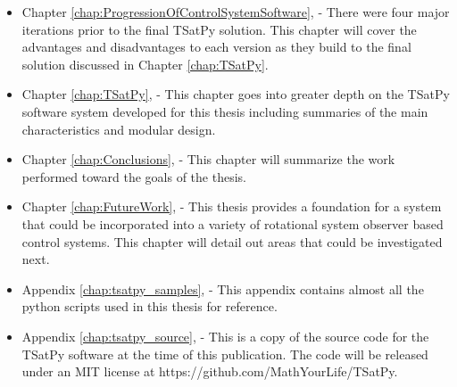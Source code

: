 \begin{itemize}
\item Chapter \ref{chap:ProgressionOfControlSystemSoftware},  - There were four major iterations prior to the final TSatPy solution.  This chapter will cover the advantages and disadvantages to each version as they build to the final solution discussed in Chapter \ref{chap:TSatPy}.
\item Chapter \ref{chap:TSatPy},  - This chapter goes into greater depth on the TSatPy software system developed for this thesis including summaries of the main characteristics and modular design.
\item Chapter \ref{chap:Conclusions},  - This chapter will summarize the work performed toward the goals of the thesis.
\item Chapter \ref{chap:FutureWork},  - This thesis provides a foundation for a system that could be incorporated into a variety of rotational system observer based control systems.  This chapter will detail out areas that could be investigated next.
\item Appendix \ref{chap:tsatpy_samples},  - This appendix contains almost all the python scripts used in this thesis for reference.
\item Appendix \ref{chap:tsatpy_source},  - This is a copy of the source code for the TSatPy software at the time of this publication.  The code will be released under an MIT license at https://github.com/MathYourLife/TSatPy.
\end{itemize}
